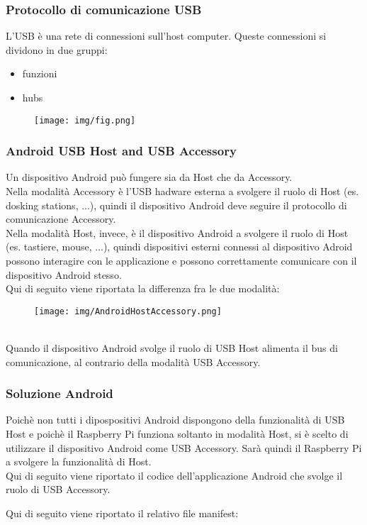 \documentclass{article}
\begin{document}
\subsubsection{Protocollo di comunicazione USB}
L'USB è una rete di connessioni sull'host computer. Queste connessioni si dividono in due gruppi:
\begin{itemize}
    \item funzioni
    \item hubs 
\end{itemize}
\begin{figure}[htbp]
\centering
\texttt{[image: img/fig.png]}
\end{figure}
\subsubsection{Android USB Host and USB Accessory}
Un dispositivo Android può fungere sia da Host che da Accessory. \\
Nella modalità Accessory è l'USB hadware esterna a svolgere il ruolo di Host (es. dosking stations, ...), quindi il dispositivo Android deve seguire il protocollo di comunicazione Accessory. \\  
Nella modalità Host, invece, è il dispositivo Android a svolgere il ruolo di Host (es. tastiere, mouse, ...), quindi dispositivi esterni connessi al dispositivo Adroid possono interagire con le applicazione e possono correttamente comunicare con il dispositivo Android stesso. \\
Qui di seguito viene riportata la differenza fra le due modalità:
\begin{figure}[htbp]
\centering
\texttt{[image: img/AndroidHostAccessory.png]}
\end{figure}
\\Quando il dispositivo Android svolge il ruolo di USB Host alimenta il bus di comunicazione, al contrario della modalità USB Accessory.
\subsubsection{Soluzione Android}
Poichè non tutti i dipospositivi Android dispongono della funzionalità di USB Host e poichè il Raspberry Pi funziona soltanto in modalità Host, si è scelto di utilizzare il dispositivo Android come USB Accessory. Sarà quindi il Raspberry Pi a svolgere la funzionalità di Host.\\
Qui di seguito viene riportato il codice dell'applicazione Android che svolge il ruolo di USB Accessory.

Qui di seguito viene riportato il relativo file manifest:

\end{document}
